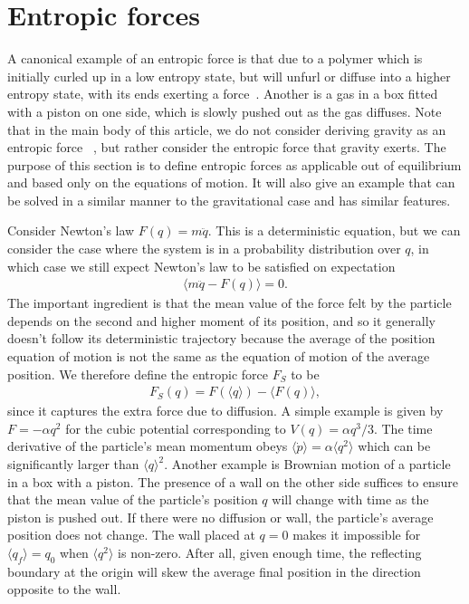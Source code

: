 \documentclass[aps,pra,amsmath,amssymb,amsthm,floatfix,nofootinbib,notitlepage,superscriptaddress,10pt]{revtex4-2}
\begin{document}
\section{Entropic forces}
\label{sec:Brownian}

A canonical example of an entropic force is that due to a polymer which is initially curled up in a low entropy state, but will unfurl or diffuse into a higher entropy state, with its ends exerting a force~\cite{neumann1977entropy,roos2014entropic}. Another is a gas in a box fitted with a piston on one side, which is slowly pushed out as the gas diffuses.
Note that in the main body of this article, we do not consider deriving gravity as an entropic force~
\cite{jacobs2014open,padmanabhan2010thermodynamical,verlinde2011origin,visser2011conservative,van2010building}, but rather consider the entropic force that gravity exerts.
The purpose of this section is to define entropic forces as applicable out of equilibrium and based only on the equations of motion. It will also give an example that can be solved in a similar manner to the gravitational case and has similar features. 


Consider Newton's law $F(q)=m\ddot{q}$. This is a deterministic equation, but we can consider the case where the system is in a probability distribution over $q$, in which case we still expect Newton's law to be satisfied on expectation
\begin{align}
	\langle m\ddot{q} - F(q)\rangle=0.
\end{align}
The important ingredient is that the mean value of the force felt by the particle depends on the second and higher moment of its position, and so it generally doesn't follow its deterministic trajectory because the average of the position equation of motion is not the same as the equation of motion of the average position. We therefore define the entropic force $F_S$ to be
\begin{align}
	F_S(q)=F(\langle q \rangle)-\langle F(q) \rangle,
\end{align}
since it captures the extra force due to diffusion.
A simple example is given by $F=-\alpha q^2$ for the  cubic potential corresponding to $V(q)=\alpha q^3/3$. The time derivative of the particle's mean momentum obeys $\langle\dot{p}\rangle=\alpha\langle q^2\rangle$ which can be significantly larger than $\langle q\rangle^2$. Another example is Brownian motion of a particle in a box with a piston.
The presence of a wall on the other side suffices to ensure that the mean value of the particle's position $q$ will change with time as the piston is pushed out. If there were no diffusion or wall, the particle's average position does not change. The wall placed at $q=0$ makes it impossible for $\langle q_f\rangle=q_0$ when $\langle q^2\rangle$ is non-zero. After all, given enough time, the reflecting boundary at the origin will skew the average final position in the direction opposite to the wall. 
\end{document}

